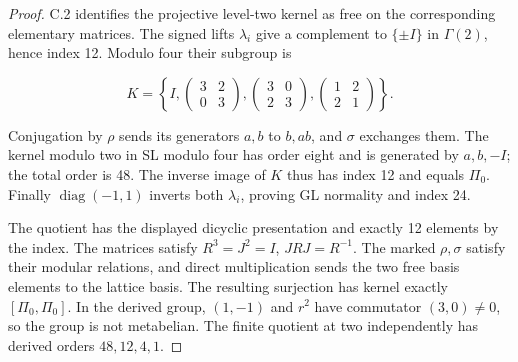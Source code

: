 \begin{proof}
C.2 identifies the projective level-two kernel as free
on the corresponding elementary matrices.
The signed lifts $\lambda_i$ give a complement to
$\{\pm I\}$ in $\Gamma(2)$, hence index 12.
Modulo four their subgroup is

$$
K=\left\{I,
 \begin{pmatrix}3&2\\0&3\end{pmatrix},
 \begin{pmatrix}3&0\\2&3\end{pmatrix},
 \begin{pmatrix}1&2\\2&1\end{pmatrix}\right\}.
$$

Conjugation by $\rho$ sends its generators $a,b$ to
$b,ab$, and $\sigma$ exchanges them.
The kernel modulo two in SL modulo four has order eight
and is generated by $a,b,-I$; the total order is 48.
The inverse image of $K$ thus has index 12 and equals
$\Pi_0$. Finally $\operatorname{diag}(-1,1)$ inverts
both $\lambda_i$, proving GL normality and index 24.

The quotient has the displayed dicyclic presentation
and exactly 12 elements by the index.
The matrices satisfy $R^3=J^2=I$, $JRJ=R^{-1}$.
The marked $\rho,\sigma$ satisfy their modular relations,
and direct multiplication sends the two free basis
elements to the lattice basis. The resulting surjection
has kernel exactly $[\Pi_0,\Pi_0]$.
In the derived group, $(1,-1)$ and $r^2$ have commutator
$(3,0)\ne0$, so the group is not metabelian.
The finite quotient at two independently has derived
orders $48,12,4,1$.
\end{proof}

